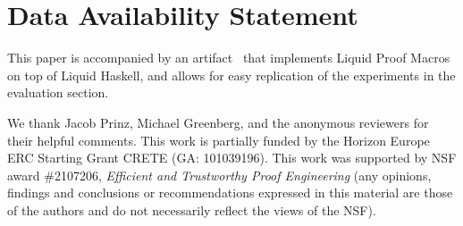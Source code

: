 \documentclass[sigplan,screen]{acmart}
\begin{document}


\maketitle











\section{Data Availability Statement}

This paper is accompanied by an artifact~\cite{lpmart} that implements
Liquid Proof Macros on top of Liquid Haskell, and allows for easy replication
of the experiments in the evaluation section.

\begin{acks}
  We thank Jacob Prinz, Michael Greenberg, and the anonymous reviewers
  for their helpful comments.  This work is partially funded by the
  Horizon Europe ERC Starting Grant CRETE (GA: 101039196). This work
  was supported by NSF award \#2107206, {\em Efficient and Trustworthy
    Proof Engineering} (any opinions, findings and conclusions or
  recommendations expressed in this material are those of the authors
  and do not necessarily reflect the views of the NSF).
\end{acks}


\balance




\end{document}

